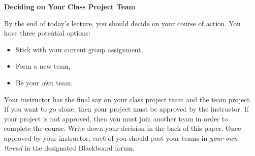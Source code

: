 \documentclass[12pt]{article}
\begin{document}
\begin{center}
{\bf Deciding on Your Class Project Team}
\end{center}

By the end of today's lecture, you should decide on your course of
action.  You have three potential options: 
\begin{itemize}
\item Stick with your current group assignment,
\item Form a new team,
\item Be your own team.
\end{itemize}
Your instructor has the final say on your class project team and the
team project.  If you want  to go alone, then your project must be
approved by the instructor.  If your project is not approved, then you
must join another team in order to complete the course.  Write down
your decision in the back of this paper.  Once approved by your
instructor, \emph{each} of you should post your teams in \emph{your
  own thread} in the designated Blackboard forum. 


\end{document}
